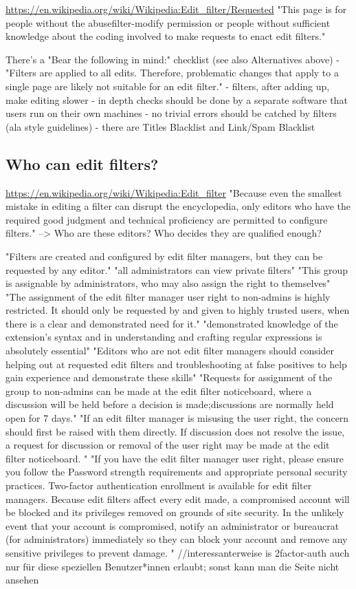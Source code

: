 \documentclass{sigchi}
\begin{document}
\url{https://en.wikipedia.org/wiki/Wikipedia:Edit_filter/Requested}
"This page is for people without the abusefilter-modify permission or people without sufficient knowledge about the coding involved to make requests to enact edit filters."

There's a "Bear the following in mind:" checklist (see also Alternatives above)
- "Filters are applied to all edits. Therefore, problematic changes that apply to a single page are likely not suitable for an edit filter."
- filters, after adding up, make editing slower
- in depth checks should be done by a separate software that users run on their own machines
- no trivial errors should be catched by filters (ala style guidelines)
- there are Titles Blacklist and Link/Spam Blacklist

\subsection{Who can edit filters?}

\url{https://en.wikipedia.org/wiki/Wikipedia:Edit_filter}
"Because even the smallest mistake in editing a filter can disrupt the encyclopedia, only editors who have the required good judgment and technical proficiency are permitted to configure filters."
--> Who are these editors? Who decides they are qualified enough?

"Filters are created and configured by edit filter managers, but they can be requested by any editor."
"all administrators can view private filters"
"This group is assignable by administrators, who may also assign the right to themselves"
"The assignment of the edit filter manager user right to non-admins is highly restricted. It should only be requested by and given to highly trusted users, when there is a clear and demonstrated need for it."
"demonstrated knowledge of the extension's syntax and in understanding and crafting regular expressions is absolutely essential"
"Editors who are not edit filter managers should consider helping out at requested edit filters and troubleshooting at false positives to help gain experience and demonstrate these skills"
"Requests for assignment of the group to non-admins can be made at the edit filter noticeboard, where a discussion will be held before a decision is made;discussions are normally held open for 7 days."
"If an edit filter manager is misusing the user right, the concern should first be raised with them directly. If discussion does not resolve the issue, a request for discussion or removal of the user right may be made at the edit filter noticeboard. "
"If you have the edit filter manager user right, please ensure you follow the Password strength requirements and appropriate personal security practices. Two-factor authentication enrollment is available for edit filter managers. Because edit filters affect every edit made, a compromised account will be blocked and its privileges removed on grounds of site security. In the unlikely event that your account is compromised, notify an administrator or bureaucrat (for administrators) immediately so they can block your account and remove any sensitive privileges to prevent damage. "
//interessanterweise is 2factor-auth auch nur für diese speziellen Benutzer*innen erlaubt; sonst kann man die Seite nicht ansehen
\end{document}
